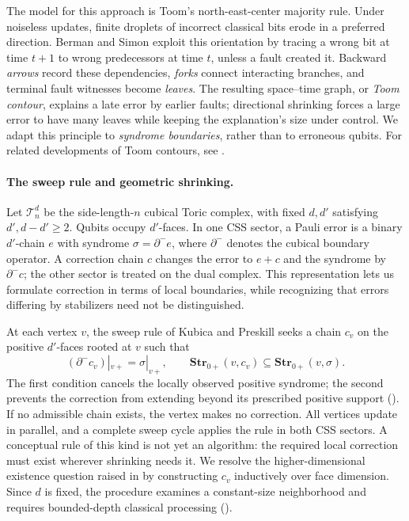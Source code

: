 The model for this approach is Toom's north-east-center majority rule. Under noiseless updates, finite droplets of incorrect classical bits erode in a preferred direction. Berman and Simon \cite{Berman} exploit this orientation by tracing a wrong bit at time $t+1$ to wrong predecessors at time $t$, unless a fault created it. Backward \emph{arrows} record these dependencies, \emph{forks} connect interacting branches, and terminal fault witnesses become \emph{leaves}. The resulting space--time graph, or \emph{Toom contour}, explains a late error by earlier faults; directional shrinking forces a large error to have many leaves while keeping the explanation's size under control. We adapt this principle to \emph{syndrome boundaries}, rather than to erroneous qubits. For related developments of Toom contours, see \cite{swart2026peierlsboundstoomcontours}.

\paragraph{The sweep rule and geometric shrinking.}
Let $\mathcal T_n^d$ be the side-length-$n$ cubical Toric complex, with fixed $d,d'$ satisfying $d',d-d'\geq 2$. Qubits occupy $d'$-faces. In one CSS sector, a Pauli error is a binary $d'$-chain $e$ with syndrome $\sigma=\partial^-e$, where $\partial^-$ denotes the cubical boundary operator. A correction chain $c$ changes the error to $e+c$ and the syndrome by $\partial^-c$; the other sector is treated on the dual complex. This representation lets us formulate correction in terms of local boundaries, while recognizing that errors differing by stabilizers need not be distinguished.

At each vertex $v$, the sweep rule of Kubica and Preskill \cite{Kubica_2019} seeks a chain $c_v$ on the positive $d'$-faces rooted at $v$ such that
\begin{equation*}
  (\partial^-c_v)|_{v+}=\sigma|_{v+},
  \qquad
  \textbf{Str}_{0+}(v,c_v)\subseteq\textbf{Str}_{0+}(v,\sigma).
\end{equation*}
The first condition cancels the locally observed positive syndrome; the second prevents the correction from extending beyond its prescribed positive support (). If no admissible chain exists, the vertex makes no correction. All vertices update in parallel, and a complete sweep cycle applies the rule in both CSS sectors. A conceptual rule of this kind is not yet an algorithm: the required local correction must exist wherever shrinking needs it. We resolve the higher-dimensional existence question raised in \cite{Kubica_2019} by constructing $c_v$ inductively over face dimension. Since $d$ is fixed, the procedure examines a constant-size neighborhood and requires bounded-depth classical processing ().

